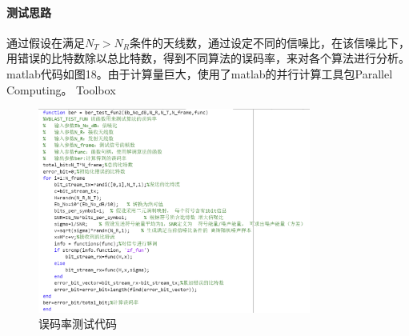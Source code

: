 \documentclass[a4paper,12pt]{article}
\begin{document}
	\paragraph{测试思路}
	通过假设在满足$N_T>N_R$条件的天线数，通过设定不同的信噪比，在该信噪比下，用错误的比特数除以总比特数，得到不同算法的误码率，来对各个算法进行分析。matlab代码如图18。由于计算量巨大，使用了matlab的并行计算工具包Parallel Computing。 Toolbox\par 
	\begin{figure}[h]
		\centering
		\includegraphics[width=0.8\textwidth]{19.png}
		\caption{误码率测试代码}
	\end{figure}
	\newpage
\end{document}
